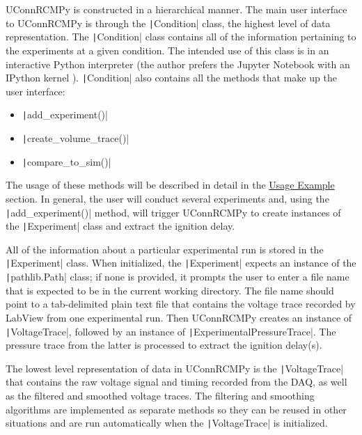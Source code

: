 \documentclass[12pt]{../ussci}
\begin{document}
UConnRCMPy is constructed in a hierarchical manner. The main user
interface to UConnRCMPy is through the \texttt|Condition| class, the
highest level of data representation. The \texttt|Condition| class
contains all of the information pertaining to the experiments at a given
condition. The intended use of this class is in an interactive Python
interpreter (the author prefers the Jupyter Notebook with an IPython
kernel \autocite{Perez2007}). \texttt|Condition| also contains all the
methods that make up the user interface:

\begin{itemize}
\item
  \texttt|add_experiment()|
\item
  \texttt|create_volume_trace()|
\item
  \texttt|compare_to_sim()|
\end{itemize}

The usage of these methods will be described in detail in the
\href{usage-example}{Usage Example} section. In general, the user will
conduct several experiments and, using the \texttt|add_experiment()|
method, will trigger UConnRCMPy to create instances of the
\texttt|Experiment| class and extract the ignition delay.

All of the information about a particular experimental run is stored in
the \texttt|Experiment| class. When initialized, the \texttt|Experiment|
expects an instance of the \texttt|pathlib.Path| class; if none is
provided, it prompts the user to enter a file name that is expected to
be in the current working directory. The file name should point to a
tab-delimited plain text file that contains the voltage trace recorded
by LabView from one experimental run. Then UConnRCMPy creates an
instance of \texttt|VoltageTrace|, followed by an instance of
\texttt|ExperimentalPressureTrace|. The pressure trace from the latter
is processed to extract the ignition delay(s).

The lowest level representation of data in UConnRCMPy is the
\texttt|VoltageTrace| that contains the raw voltage signal and timing
recorded from the DAQ, as well as the filtered and smoothed voltage
traces. The filtering and smoothing algorithms are implemented as
separate methods so they can be reused in other situations and are run
automatically when the \texttt|VoltageTrace| is initialized.
\end{document}
